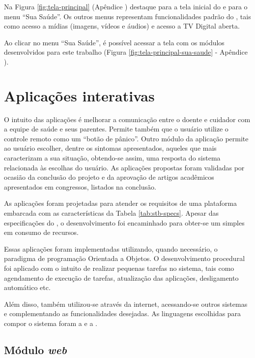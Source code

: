Na Figura \ref{fig:tela-principal} (Apêndice )
destaque para a tela inicial do \software[] \xbmc[] e para o menu ``Sua
Saúde''.  Os outros menus representam funcionalidades padrão do \software[] \xbmc, 
tais como acesso a mídias (imagens, vídeos e áudios) e acesso a TV
Digital aberta.

Ao clicar no menu ``Sua Saúde'', é possível acessar a tela com os módulos desenvolvidos
para este trabalho (Figura \ref{fig:tela-principal-sua-saude} - Apêndice 
).

\section{Aplicações interativas} \label{subsec:aplicacoes-tv-health}

O intuito das aplicações é melhorar a comunicação entre o doente e cuidador com
a equipe de saúde e seus parentes. Permite também que o usuário utilize o
controle remoto como um ``botão de pânico''. Outro módulo da aplicação permite
ao usuário escolher, dentre os sintomas apresentados, aqueles que mais
caracterizam a sua situação, obtendo-se assim, uma resposta do sistema
relacionada às escolhas do usuário. As aplicações  propostas foram validadas
por ocasião da conclusão do projeto \nextsaude[] e da aprovação de artigos
acadêmicos apresentados em congressos, listados na conclusão.

As aplicações foram projetadas para atender os requisitos de uma plataforma
embarcada com as características da Tabela \ref{tab:stb-specs}. Apesar 
das especificações do \hardware[], o desenvolvimento foi encaminhado para 
obter-se um \software[] simples em consumo de recursos.

Essas aplicações foram implementadas utilizando, quando necessário, o paradigma
de programação Orientada a Objetos. O desenvolvimento procedural foi aplicado
com o intuito de realizar pequenas tarefas no sistema, tais como agendamento
de execução de tarefas, atualização das aplicações, desligamento automático etc.

Além disso, também utilizou-se \webservices[] através da internet, acessando-se
outros sistemas e complementando as funcionalidades desejadas. As linguagens
escolhidas para compor o sistema foram a \python[] e a \shell.

\subsection{Módulo \textit{web}}

